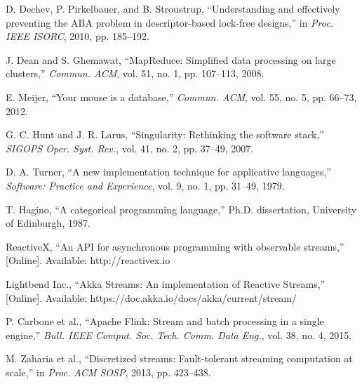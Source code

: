 \documentclass[10pt,conference]{IEEEtran}
\begin{document}
\begin{thebibliography}{99}
D. Dechev, P. Pirkelbauer, and B. Stroustrup, ``Understanding and effectively preventing the ABA problem in descriptor-based lock-free designs,'' in \emph{Proc. IEEE ISORC}, 2010, pp. 185--192.

J. Dean and S. Ghemawat, ``MapReduce: Simplified data processing on large clusters,'' \emph{Commun. ACM}, vol. 51, no. 1, pp. 107--113, 2008.

E. Meijer, ``Your mouse is a database,'' \emph{Commun. ACM}, vol. 55, no. 5, pp. 66--73, 2012.

G. C. Hunt and J. R. Larus, ``Singularity: Rethinking the software stack,'' \emph{SIGOPS Oper. Syst. Rev.}, vol. 41, no. 2, pp. 37--49, 2007.

D. A. Turner, ``A new implementation technique for applicative languages,'' \emph{Software: Practice and Experience}, vol. 9, no. 1, pp. 31--49, 1979.

T. Hagino, ``A categorical programming language,'' Ph.D. dissertation, University of Edinburgh, 1987.

ReactiveX, ``An API for asynchronous programming with observable streams,'' [Online]. Available: http://reactivex.io

Lightbend Inc., ``Akka Streams: An implementation of Reactive Streams,'' [Online]. Available: https://doc.akka.io/docs/akka/current/stream/

P. Carbone et al., ``Apache Flink: Stream and batch processing in a single engine,'' \emph{Bull. IEEE Comput. Soc. Tech. Comm. Data Eng.}, vol. 38, no. 4, 2015.

M. Zaharia et al., ``Discretized streams: Fault-tolerant streaming computation at scale,'' in \emph{Proc. ACM SOSP}, 2013, pp. 423--438.

\end{thebibliography}
\end{document}
